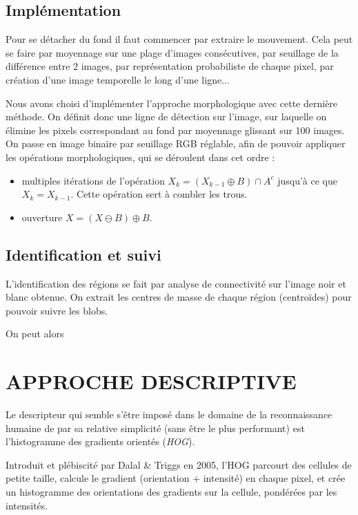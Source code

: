 \documentclass{article}
\begin{document}
	\subsection{Implémentation}
	Pour se détacher du fond il faut commencer par extraire le mouvement. Cela peut se faire par moyennage sur une plage d'images consécutives, par seuillage de la différence entre 2 images, par représentation probabiliste de chaque pixel, par création d'une image temporelle le long d'une ligne...
	
	Nous avons choisi d'implémenter l'approche morphologique avec cette dernière méthode. On définit donc une ligne de détection sur l'image, sur laquelle on élimine les pixels correspondant au fond par moyennage glissant sur 100 images. 
	On passe en image binaire par seuillage RGB réglable, afin de pouvoir appliquer les opérations morphologiques, qui se déroulent dans cet ordre :
	\begin{itemize}
	\item multiples itérations de l'opération $X_k = (X_{k-1} \oplus B) \cap A^c$ jusqu'à ce que $X_k = X_{k-1}$. Cette opération sert à combler les trous.
	\item ouverture $X = (X \ominus B) \oplus B$.
	\end{itemize}
	
	\subsection{Identification et suivi}
	L'identification des régions se fait par analyse de connectivité sur l'image noir et blanc obtenue. On extrait les centres de masse de chaque région (centroïdes) pour pouvoir suivre les blobs.
	
	On peut alors 
	

\section{APPROCHE DESCRIPTIVE}
\label{sec:desc}

	Le descripteur qui semble s'être imposé dans le domaine de la reconnaissance humaine de par sa relative simplicité (sans être le plus performant) est l'histogramme des gradients orientés (\emph{HOG}).
	
	Introduit et plébiscité par Dalal \& Triggs \cite{HOG} en 2005, l'HOG parcourt des cellules de petite taille, calcule le gradient (orientation + intensité) en chaque pixel, et crée un histogramme des orientations des gradients sur la cellule, pondérées par les intensités.
	
\end{document}
